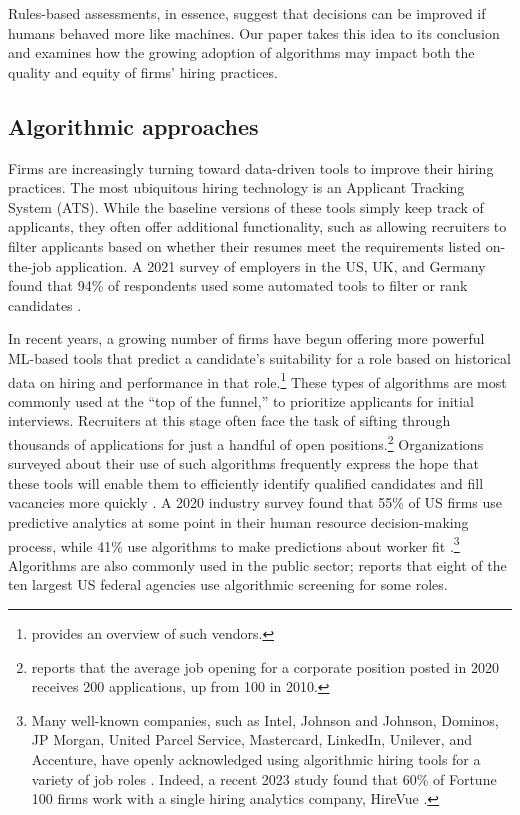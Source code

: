 \documentclass[crop,noquery,editorname,historyrev,nosurname,runningno,sepcount]{RESTUD}
\begin{document}
Rules-based assessments, in essence, suggest that decisions can be improved if humans behaved more like machines.  Our paper takes this idea to its conclusion and examines how the growing adoption of algorithms may impact both the quality and equity of firms' hiring practices. 


\subsection{Algorithmic approaches} \label{sec:adopt}

Firms are increasingly turning toward data-driven tools to improve their hiring practices. The most ubiquitous hiring technology is an Applicant Tracking System (ATS).  While the baseline versions of these tools simply keep track of applicants, they often offer additional functionality, such as allowing recruiters to filter applicants based on whether their resumes meet the requirements listed on-the-job application.  A 2021 survey of employers in the US, UK, and Germany found that 94\% of respondents used some automated tools to filter or rank candidates \citep{fullerHiddenWorkersUntapped}. 

In recent years, a growing number of firms have begun offering more powerful ML-based tools that predict a candidate's suitability for a role based on historical data on hiring and performance in that role.\footnote{\citet{raghavan2019} provides an overview of such vendors.}  These types of algorithms are most commonly used at the ``top of the funnel,'' to prioritize applicants for initial interviews. Recruiters at this stage often face the task of sifting through thousands of applications for just a handful of open positions.\footnote{\citet{fullerHiddenWorkersUntapped} reports that the average job opening for a corporate position posted in 2020 receives 200 applications, up from 100 in 2010.}  Organizations surveyed about their use of such algorithms frequently express the hope that these tools will enable them to efficiently identify qualified candidates and fill vacancies more quickly \citep{upturn}. A 2020 industry survey found that 55\% of US firms use predictive analytics at some point in their human resource decision-making process, while 41\% use algorithms to make predictions about worker fit \citep{mercer2020}.\footnote{Many well-known companies, such as Intel, Johnson and Johnson, Dominos, JP Morgan, United Parcel Service, Mastercard, LinkedIn, Unilever, and Accenture, have openly acknowledged using algorithmic hiring tools for a variety of job roles \citep{qz}.  Indeed, a recent 2023 study found that 60\% of Fortune 100 firms work with a single hiring analytics company, HireVue \citep{nawratHireVue2023}.}  Algorithms are also commonly used in the public sector; \citet{nawratHireVue2023} reports that eight of the ten largest US federal agencies use algorithmic screening for some roles.
\end{document}

